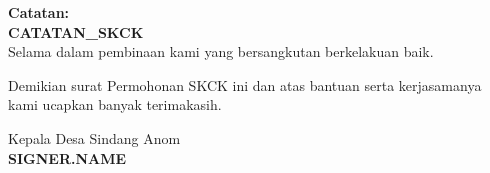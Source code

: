 \documentclass[a4paper, 12pt]{article}
\begin{document}
\textbf{Catatan:} \\
\textbf{{{CATATAN_SKCK}}} \\ %
Selama dalam pembinaan kami yang bersangkutan berkelakuan baik. 

Demikian surat Permohonan SKCK ini dan atas bantuan serta kerjasamanya kami ucapkan banyak terimakasih.

\vspace{1cm}

\begin{flushright}
    \begin{minipage}{0.5\textwidth}
        \centering
        Kepala Desa Sindang Anom \\
        \vspace{2.5cm} 
        \textbf{{{SIGNER.NAME}}}
    \end{minipage}
\end{flushright}
\end{document}
